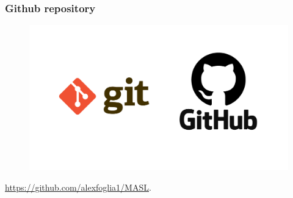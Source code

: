 \documentclass[xcolor ={table,usenames,dvipsnames}]{beamer}
\theoremstyle{definition}
\begin{document}
\begin{frame}
	\frametitle{Github repository}
	\begin{figure}[h!]
		\centering
		\includegraphics[scale=0.15]{img/github.PNG}
	\end{figure}
	\begin{center}
		\color{blue}\href{https://github.com/alexfoglia1/MASL}{https://github.com/alexfoglia1/MASL}.
	\end{center} 
\end{frame}
\end{document}
